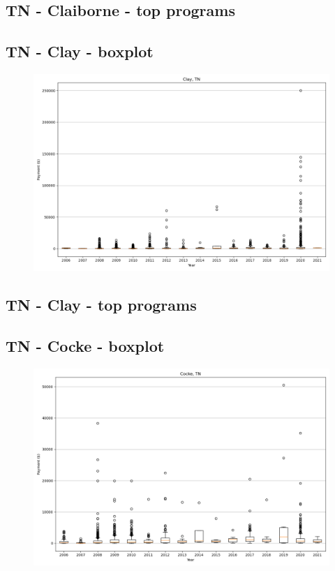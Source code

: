 \subsection*{TN - Claiborne - top programs}

\newpage
\subsection*{TN - Clay - boxplot}
\begin{figure}[h]
\centering
\includegraphics[width=7in]{../output/boxplots/counties/Clay-TN_boxplot.png}
\end{figure}


\subsection*{TN - Clay - top programs}

\newpage
\subsection*{TN - Cocke - boxplot}
\begin{figure}[h]
\centering
\includegraphics[width=7in]{../output/boxplots/counties/Cocke-TN_boxplot.png}
\end{figure}


